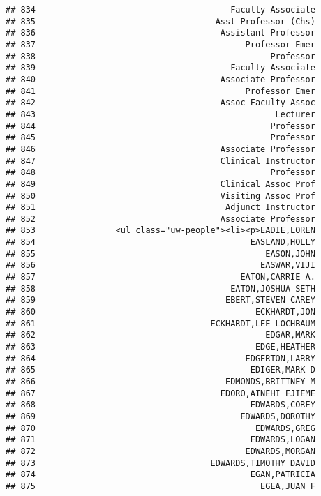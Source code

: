 \documentclass[
]{article}
\begin{document}
\begin{verbatim}
## 834                                       Faculty Associate
## 835                                    Asst Professor (Chs)
## 836                                     Assistant Professor
## 837                                          Professor Emer
## 838                                               Professor
## 839                                       Faculty Associate
## 840                                     Associate Professor
## 841                                          Professor Emer
## 842                                     Assoc Faculty Assoc
## 843                                                Lecturer
## 844                                               Professor
## 845                                               Professor
## 846                                     Associate Professor
## 847                                     Clinical Instructor
## 848                                               Professor
## 849                                     Clinical Assoc Prof
## 850                                     Visiting Assoc Prof
## 851                                      Adjunct Instructor
## 852                                     Associate Professor
## 853                <ul class="uw-people"><li><p>EADIE,LOREN
## 854                                           EASLAND,HOLLY
## 855                                              EASON,JOHN
## 856                                             EASWAR,VIJI
## 857                                         EATON,CARRIE A.
## 858                                       EATON,JOSHUA SETH
## 859                                      EBERT,STEVEN CAREY
## 860                                            ECKHARDT,JON
## 861                                   ECKHARDT,LEE LOCHBAUM
## 862                                              EDGAR,MARK
## 863                                            EDGE,HEATHER
## 864                                          EDGERTON,LARRY
## 865                                           EDIGER,MARK D
## 866                                      EDMONDS,BRITTNEY M
## 867                                     EDORO,AINEHI EJIEME
## 868                                           EDWARDS,COREY
## 869                                         EDWARDS,DOROTHY
## 870                                            EDWARDS,GREG
## 871                                           EDWARDS,LOGAN
## 872                                          EDWARDS,MORGAN
## 873                                   EDWARDS,TIMOTHY DAVID
## 874                                           EGAN,PATRICIA
## 875                                             EGEA,JUAN F

\end{verbatim}
\end{document}
